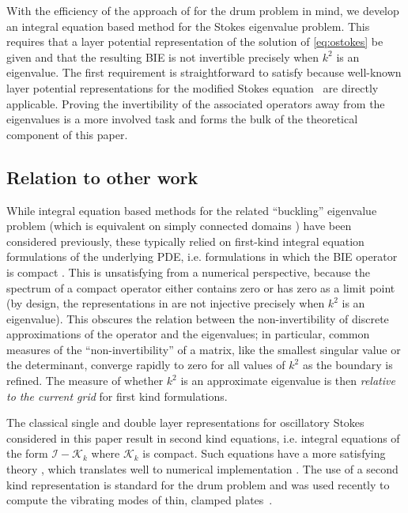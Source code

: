 With the efficiency of the approach of
\cite{zhao2015robust} for the drum problem in mind,
we develop an integral equation based method for the
Stokes eigenvalue problem.
%
This requires that a layer
potential representation of the solution
of \cref{eq:ostokes} be given and that the resulting BIE
is not invertible precisely when $k^2$ is an eigenvalue.
%
The first requirement is straightforward to
satisfy because 
well-known layer potential representations for the
modified Stokes equation~\cite{Pozrikidis1992,biros2002embedded,
  jiang2013second,ladyzhenskaya1969mathematical}
are directly applicable.
%
Proving the invertibility of the associated operators
away from the eigenvalues is a more involved task
and forms the bulk of the theoretical component
of this paper.

\subsection{Relation to other work}

While integral equation based methods for the
related ``buckling'' eigenvalue problem
(which is equivalent  on simply connected domains
\cite{kelliher2009eigenvalues})
have been considered previously,
these typically relied on first-kind integral
equation formulations of the underlying PDE,
i.e. formulations in which the BIE operator is
compact \cite{kitahara2014boundary,antunes2011buckling}.
%
This is unsatisfying from a numerical
perspective, because the spectrum of a
compact operator either contains zero
or has zero as a limit point
(by design, the representations in
\cite{kitahara2014boundary,antunes2011buckling}
are not injective precisely when
$k^2$ is an eigenvalue).
%
This obscures the relation between
the non-invertibility of discrete approximations
of the operator and the eigenvalues;
in particular, common measures of the
``non-invertibility'' of a matrix, like the
smallest singular value or the determinant,
converge rapidly to zero for all values
of $k^2$ as the boundary is refined.
The measure of whether $k^2$ is an
approximate eigenvalue is then {\em relative to the
  current grid} for first kind formulations.

The classical single and double layer representations
for oscillatory Stokes considered in this paper
result in second kind equations, i.e. integral equations
of the form $\mathcal{I} - \mathcal{K}_k$ where
$\mathcal{K}_k$ is compact.
%
Such equations have a more satisfying theory
\cite{reed1972methods,colton1983integral,kress1989linear},
which translates well to numerical implementation
\cite{atkinson2009numerical,bornemann2010numerical,
  hackbusch2012integral,zhao2015robust}.
%
The use of a second kind representation is standard
for the drum problem \cite{backer2003numerical,zhao2015robust}
and was used recently to compute the vibrating
modes of thin, clamped plates~\cite{lindsay2018boundary}.

